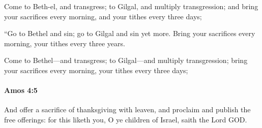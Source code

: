 			\begin{versebox}
					\item[BHS] 
					\item[LXX] 
					\item[ASV] Come to Beth-el, and transgress; to Gilgal, and multiply transgression; and bring your sacrifices every morning, and your tithes every three days;
					\item[NIV] “Go to Bethel and sin; go to Gilgal and sin yet more. Bring your sacrifices every morning, your tithes every three years.
					\item[NRSV] Come to Bethel—and transgress; to Gilgal—and multiply transgression; bring your sacrifices every morning, your tithes every three days;
			\end{versebox}

		\paragraph{Amos 4:5} %
			\label{AMOS-4-5}

			And offer a sacrifice of thanksgiving with leaven, and proclaim and publish the free offerings: for this liketh you, O ye children of Israel, saith the Lord GOD.

